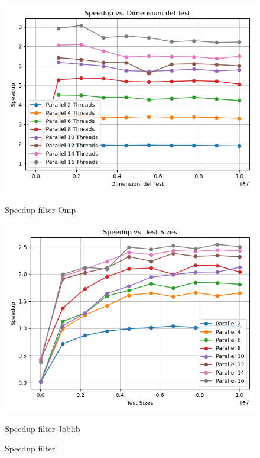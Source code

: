 \documentclass[11pt]{article}
\begin{document}
    \begin{figure}[H]
        \centering
        \includegraphics[width=\linewidth]{omp/001/filter_speedup_plot}
            \caption{Speedup filter Omp}\label{fig:filter_speedup_omp}
        \endminipage\hfill
        \includegraphics[width=\linewidth]{joblib/001/filter_speedup_plot}
            \caption{Speedup filter Joblib}\label{fig:filter_speedup_joblib}
        \endminipage\hfill
        \caption{Speedup filter}
    \end{figure}
\end{document}

